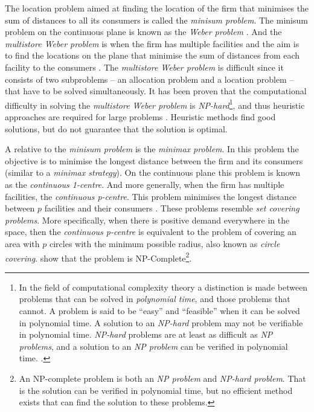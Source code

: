 \documentclass[preprint, 12pt]{elsarticle}
\begin{document}
The location problem aimed at finding the location of the firm that minimises the sum of distances to all its consumers is called the \emph{minisum problem}. The minisum problem on the continuous plane is known as the \emph{Weber problem} \citep[chapter~1]{Eiselt_Marianov_2011}. And the \emph{multistore Weber problem} is when the firm has multiple facilities and the aim is to find the locations on the plane that minimise the sum of distances from each facility to the consumers \citep[chapter~15]{Eiselt_Marianov_2011}. The \emph{multistore Weber problem} is difficult since it consists of two subproblems -- an allocation problem and a location problem -- that have to be solved simultaneously. It has been proven that the computational difficulty in solving the \emph{multistore Weber problem} is \emph{NP-hard}\footnote{In the field of computational complexity theory a distinction is made between problems that can be solved in \emph{polynomial time}, and those problems that cannot. A problem is said to be ``easy'' and ``feasible'' when it can be solved in polynomial time. A solution to an \emph{NP-hard} problem may not be verifiable in polynomial time. \emph{NP-hard} problems are at least as difficult as \emph{NP problems}, and a solution to an \emph{NP problem} can be verified in polynomial time. \citep[Appendix B]{Ahuja_Magnanti_Orlin_1988}.}, and thus heuristic approaches are required for large problems \citep[p.~336]{Eiselt_Marianov_2011}. Heuristic methods find good solutions, but do not guarantee that the solution is optimal.

A relative to the \emph{minisum problem} is the \emph{minimax problem}. In this problem the objective is to minimise the longest distance between the firm and its consumers (similar to a \emph{minimax strategy}). On the continuous plane this problem is known as the \emph{continuous 1-centre}. And more generally, when the firm has multiple facilities, the \emph{continuous p-centre}. This problem minimises the longest distance between $p$ facilities and their consumers \citep[chapter~4]{Eiselt_Marianov_2011}. These problems resemble \emph{set covering problems}. More specifically, when there is positive demand everywhere in the space, then the \emph{continuous p-centre} is equivalent to the problem of covering an area with $p$ circles with the minimum possible radius, also known as \emph{circle covering}. \citet{Masuyama_Ibaraki_Hasegawa_1981} show that the problem is NP-Complete\footnote{An NP-complete problem is both an \emph{NP problem} and \emph{NP-hard problem}. That is the solution can be verified in polynomial time, but no efficient method exists that can find the solution to these problems.}.
\end{document}
